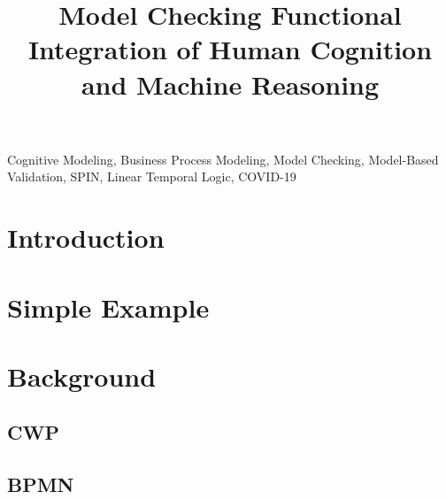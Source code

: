 \documentclass[conference]{IEEEtran}
\begin{document}
\title{
  Model Checking Functional Integration of Human Cognition and Machine Reasoning
}

\author{
\and
{}
}

\maketitle

\begin{abstract}
    
\end{abstract}

\begin{IEEEkeywords}
    Cognitive Modeling, Business Process Modeling, Model Checking, Model-Based Validation, SPIN, Linear Temporal Logic, COVID-19
\end{IEEEkeywords}

\section{Introduction}


\section{Simple Example}
\label{sec:simpleExample}


\section{Background}
\label{sec:background}


\subsection{CWP}
\label{sec:backgroundCWP}


\subsection{BPMN}
\label{sec:backgroundBPMN}

\end{document}

